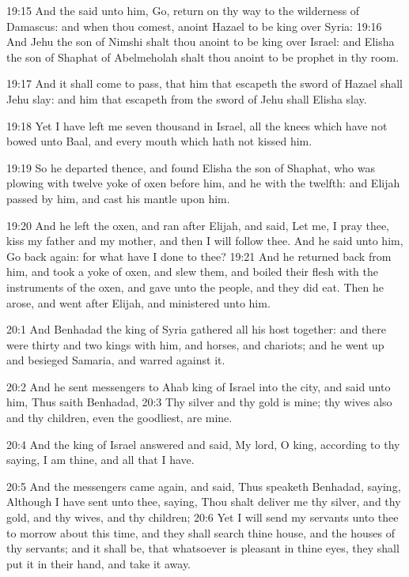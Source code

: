 19:15 And the \LORD said unto him, Go, return on thy way to the wilderness of Damascus: and when thou comest, anoint Hazael to be king over Syria: 19:16 And Jehu the son of Nimshi shalt thou anoint to be king over Israel: and Elisha the son of Shaphat of Abelmeholah shalt thou anoint to be prophet in thy room.

19:17 And it shall come to pass, that him that escapeth the sword of Hazael shall Jehu slay: and him that escapeth from the sword of Jehu shall Elisha slay.

19:18 Yet I have left me seven thousand in Israel, all the knees which have not bowed unto Baal, and every mouth which hath not kissed him.

19:19 So he departed thence, and found Elisha the son of Shaphat, who was plowing with twelve yoke of oxen before him, and he with the twelfth: and Elijah passed by him, and cast his mantle upon him.

19:20 And he left the oxen, and ran after Elijah, and said, Let me, I pray thee, kiss my father and my mother, and then I will follow thee.  And he said unto him, Go back again: for what have I done to thee?  19:21 And he returned back from him, and took a yoke of oxen, and slew them, and boiled their flesh with the instruments of the oxen, and gave unto the people, and they did eat. Then he arose, and went after Elijah, and ministered unto him.

20:1 And Benhadad the king of Syria gathered all his host together: and there were thirty and two kings with him, and horses, and chariots; and he went up and besieged Samaria, and warred against it.

20:2 And he sent messengers to Ahab king of Israel into the city, and said unto him, Thus saith Benhadad, 20:3 Thy silver and thy gold is mine; thy wives also and thy children, even the goodliest, are mine.

20:4 And the king of Israel answered and said, My lord, O king, according to thy saying, I am thine, and all that I have.

20:5 And the messengers came again, and said, Thus speaketh Benhadad, saying, Although I have sent unto thee, saying, Thou shalt deliver me thy silver, and thy gold, and thy wives, and thy children; 20:6 Yet I will send my servants unto thee to morrow about this time, and they shall search thine house, and the houses of thy servants; and it shall be, that whatsoever is pleasant in thine eyes, they shall put it in their hand, and take it away.


